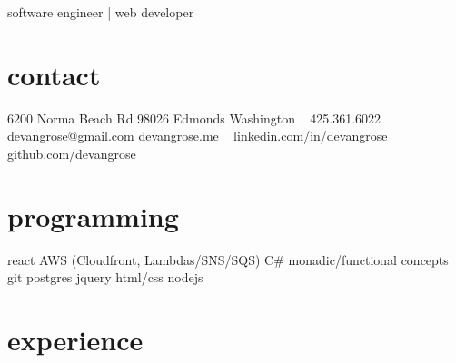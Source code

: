 \documentclass[]{friggeri-cv}
\begin{document}
       { software engineer | web developer }




\begin{aside}
  \section{contact}
    6200 Norma Beach Rd
    98026 Edmonds
    Washington
    ~
    425.361.6022
    \href{mailto:devangrose@gmail.com}{devangrose@gmail.com}
    \href{http://devangrose.me}{devangrose.me}
    ~
    linkedin.com/in/devangrose
    github.com/devangrose
  \section{programming}
    react
    AWS (Cloudfront, Lambdas/SNS/SQS)
    C\#
    monadic/functional concepts
    git
    postgres
    jquery
    html/css
    nodejs

\end{aside}

\section{experience}
\end{document}
